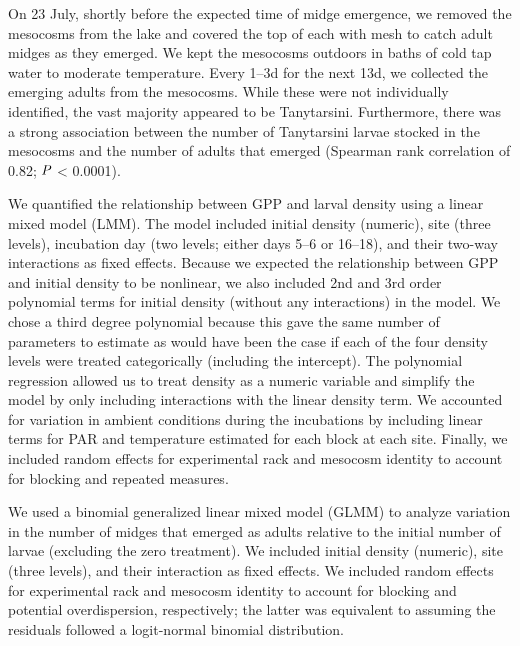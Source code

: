 On 23 July, shortly before the expected time of midge emergence,
we removed the mesocosms from the lake and covered the top of each with mesh
to catch adult midges as they emerged. 
We kept the mesocosms outdoors in baths of cold tap water 
to moderate temperature.
Every 1--3d for the next 13d, we collected the emerging adults from the mesocosms.
While these were not individually identified, the vast majority appeared to be Tanytarsini.
Furthermore, there was a strong association between the number of Tanytarsini larvae 
stocked in the mesocosms and the number of adults that emerged 
(Spearman rank correlation of 0.82; $\emph{P}$ < 0.0001).

We quantified the relationship between GPP and larval density using a 
linear mixed model (LMM). 
The model included initial density (numeric), site (three levels),
incubation day (two levels; either days 5--6 or 16--18), 
and their two-way interactions as fixed effects.
Because we expected the relationship between GPP and initial density to be nonlinear,
we also included 2nd and 3rd order polynomial terms for initial density 
(without any interactions) in the model.
We chose a third degree polynomial because this gave the same number of parameters 
to estimate as would have been the case if each of the four density levels were treated 
categorically (including the intercept). 
The polynomial regression allowed us to treat density as a numeric variable 
and simplify the model by only including interactions with the linear density term.
We accounted for variation in ambient conditions during the incubations by including
linear terms for PAR and temperature estimated for each block at each site.
Finally, we included random effects for experimental rack and mesocosm identity to account
for blocking and repeated measures.

We used a binomial generalized linear mixed model (GLMM) to analyze variation 
in the number of midges that emerged as adults
relative to the initial number of larvae
(excluding the zero treatment). 
We included initial density (numeric), site (three levels), and their interaction
as fixed effects. 
We included random effects for experimental rack and mesocosm identity to account
for blocking and potential overdispersion, respectively;
the latter was equivalent to assuming the residuals followed a 
logit-normal binomial distribution.

